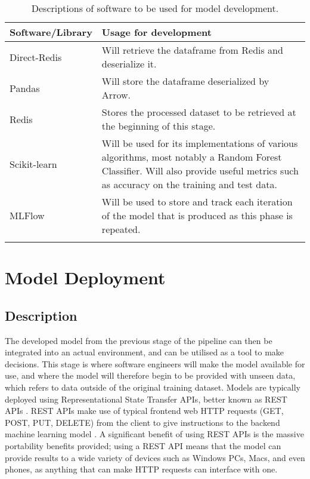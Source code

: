 \begin{longtable}{ |p{}| p{}|}
    \hline
    \cellcolor{blue!25}Software/Library & \cellcolor{blue!25}Usage for development\\
    \hline
    Direct-Redis &
    Will retrieve the dataframe from Redis and deserialize it.\\
    \hline
    Pandas & 
    Will store the dataframe deserialized by Arrow.\\
    \hline
    Redis &
    Stores the processed dataset to be retrieved at the beginning of this stage.\\
    \hline
    Scikit-learn & 
    Will be used for its implementations of various algorithms, most notably a Random Forest Classifier.
    Will also provide useful metrics such as accuracy on the training and test data.\\
    \hline
    MLFlow &
    Will be used to store and track each iteration of the model that is produced as this phase is 
    repeated.\\
    \hline
\caption{Descriptions of software to be used for model development.}\label{tab:DevelopmentSoftware}
\end{longtable}

\section{Model Deployment}\label{sec:Deployment}
\subsection{Description}
The developed model from the previous stage of the pipeline can then be integrated into an actual environment,
and can be utilised as a tool to make decisions. This stage is where software engineers will make the model 
available for use, and where the model will therefore begin to be provided with unseen data, which refers to data 
outside of the original training dataset. Models are typically deployed using Representational State Transfer APIs, 
better known as REST APIs \autocite{redhat_what_nodate}. REST APIs make use of typical frontend web 
HTTP requests (GET, POST, PUT, DELETE) from the client to give instructions to the backend machine learning
model \autocite{restfulapi_what_2023}. A significant benefit of using REST APIs is the 
massive portability benefits provided; using a REST API means that the model can provide results to a 
wide variety of devices such as Windows PCs, Macs, and even phones, as anything that can make HTTP requests 
can interface with one.


